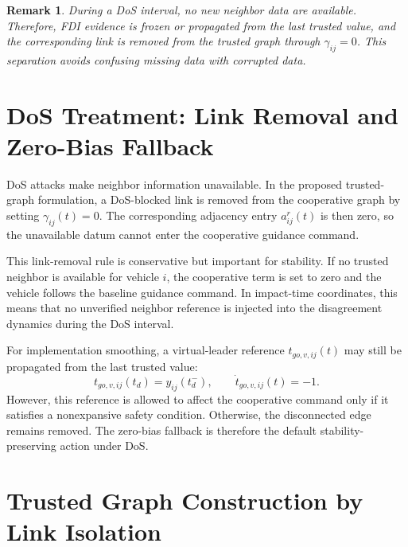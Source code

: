 \documentclass[lettersize,journal]{IEEEtran}
\newtheorem{remark}{Remark}
\begin{document}
\begin{remark}
During a DoS interval, no new neighbor data are available. Therefore, FDI evidence is frozen or propagated from the last trusted value, and the corresponding link is removed from the trusted graph through $\gamma_{ij}=0$. This separation avoids confusing missing data with corrupted data.
\end{remark}

\section{DoS Treatment: Link Removal and Zero-Bias Fallback}

DoS attacks make neighbor information unavailable. In the proposed trusted-graph formulation, a DoS-blocked link is removed from the cooperative graph by setting $\gamma_{ij}(t)=0$. The corresponding adjacency entry $a_{ij}^r(t)$ is then zero, so the unavailable datum cannot enter the cooperative guidance command.

This link-removal rule is conservative but important for stability. If no trusted neighbor is available for vehicle $i$, the cooperative term is set to zero and the vehicle follows the baseline guidance command. In impact-time coordinates, this means that no unverified neighbor reference is injected into the disagreement dynamics during the DoS interval.

For implementation smoothing, a virtual-leader reference $t_{go,v,ij}(t)$ may still be propagated from the last trusted value:
\begin{equation}
    t_{go,v,ij}(t_d)=y_{ij}(t_d^-),\qquad
    \dot t_{go,v,ij}(t)=-1.
    \label{eq:virtual_hold}
\end{equation}
However, this reference is allowed to affect the cooperative command only if it satisfies a nonexpansive safety condition. Otherwise, the disconnected edge remains removed. The zero-bias fallback is therefore the default stability-preserving action under DoS.

\section{Trusted Graph Construction by Link Isolation}
\end{document}
